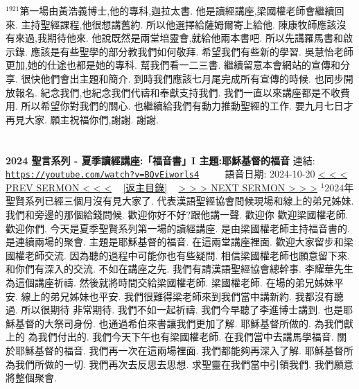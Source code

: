 \documentclass{book}
\begin{document}
$^{1921}$第一場由黃浩義博士,他的專科,迦拉太書.
他是讀經講座,梁國權老師會繼續回來.
主持聖經課程,他很想講舊約.
所以他選擇給薩姆爾寄上給他.
陳康牧師應該沒有來過,我期待他來.
他說既然是兩堂培靈會,就給他兩本書吧.
所以先講羅馬書和啟示錄.
應該是有些聖學的部分教我們如何敬拜.
希望我們有些新的學習.
吳慧怡老師更加,她的仕途也都是她的專科.
幫我們看一二三書.
繼續留意本會網站的宣傳和分享.
很快他們會出主題和簡介.
到時我們應該七月尾完成所有宣傳的時候.
也同步開放報名.
紀念我們,也紀念我們代禱和奉獻支持我們.
我們一直以來講座都是不收費用.
所以希望你對我們的關心.
也繼續給我們有動力推動聖經的工作.
要九月七日才再見大家.
願主祝福你們,謝謝.
謝謝.
\newpage



\section{}
\label{sec:BQvEiworls4}
\textbf{2024 聖言系列 - 夏季讀經講座:「福音書」I 主題:耶穌基督的福音}
\newline
\newline
連結: \href{https://youtube.com/watch?v=BQvEiworls4}{\texttt{https://youtube.com/watch?v=BQvEiworls4}} ~~~~ 語音日期: 2024-10-20
\newline
\newline
\hyperref[sec:evqz1q_hC_A]{\small{< < < PREV SERMON < < <}}
~
\hyperref[sec:index]{\small{[返主目錄]}}
~
\hyperref[sec:FsXNMWFwxHg]{\small{> > > NEXT SERMON > > >}}
\newline
\newline
$^{1}$2024年聖賢系列已經三個月沒有見大家了.
代表漢語聖經協會問候現場和線上的弟兄姊妹.
我們和旁邊的那個給錢問候.
歡迎你好不好?跟他講一聲.
歡迎你 歡迎梁國權老師.
歡迎你們.
今天是夏季聖賢系列第一場的讀經講座.
是由梁國權老師主持福音書的.
是連續兩場的聚會.
主題是耶穌基督的福音.
在這兩堂講座裡面.
歡迎大家留步和梁國權老師交流.
因為聽的過程中可能你也有些疑問.
相信梁國權老師也願意留下來.
和你們有深入的交流.
不如在講座之先.
我們有請漢語聖經協會總幹事.
李耀華先生為這個講座祈禱.
然後就將時間交給梁國權老師.
梁國權老師.
在場的弟兄姊妹平安.
線上的弟兄姊妹也平安.
我們很難得梁老師來到我們當中講新約.
我都沒有聽過.
所以很期待 非常期待.
我們不如一起祈禱.
我們今早聽了李進博士講到.
也是耶穌基督的大祭司身份.
也通過希伯來書讓我們更加了解.
耶穌基督所做的.
為我們獻上的 為我們付出的.
我們今天下午也有梁國權老師.
在我們當中去講馬學福音.
關於耶穌基督的福音.
我們再一次在這兩場裡面.
我們都能夠再深入了解.
耶穌基督所為我們所做的一切.
我們再次去反思去思想.
求聖靈在我們當中引領我們.
我們願意將整個聚會.
\end{document}

